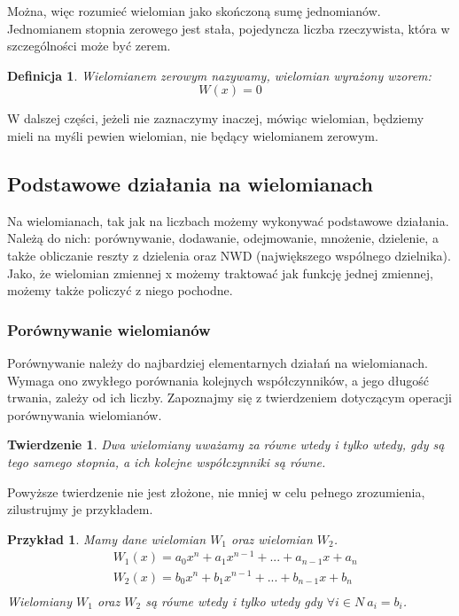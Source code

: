 \documentclass[twoside,a4paper]{book}
\newtheorem{theorem}{Twierdzenie}
\newtheorem{definition}{Definicja}
\newtheorem{example}{Przykład}
\begin{document}
Można, więc rozumieć wielomian jako skończoną sumę jednomianów.
Jednomianem stopnia zerowego jest stała, pojedyncza liczba rzeczywista, która w szczególności może być zerem.

\begin{definition}
	Wielomianem zerowym nazywamy, wielomian wyrażony wzorem:
	\begin{equation}
		W(x) = 0
	\end{equation}
\end{definition}

W dalszej części, jeżeli nie zaznaczymy inaczej, mówiąc wielomian, będziemy mieli na myśli pewien wielomian, nie będący wielomianem zerowym.

\subsection{Podstawowe działania na wielomianach}

Na wielomianach, tak jak na liczbach możemy wykonywać podstawowe działania. Należą do nich: porównywanie, dodawanie, odejmowanie, mnożenie, dzielenie, a także obliczanie reszty z dzielenia oraz NWD (największego wspólnego dzielnika). Jako, że wielomian zmiennej x możemy traktować jak funkcję jednej zmiennej, możemy także policzyć z niego pochodne.

\subsubsection{Porównywanie wielomianów}

Porównywanie należy do najbardziej elementarnych działań na wielomianach. Wymaga ono zwykłego porównania kolejnych współczynników, a jego długość trwania, zależy od ich liczby. Zapoznajmy się z twierdzeniem dotyczącym operacji porównywania wielomianów.

\begin{theorem}
	Dwa wielomiany uważamy za równe wtedy i tylko wtedy, gdy są tego samego stopnia, a ich kolejne współczynniki są równe.
\end{theorem}

Powyższe twierdzenie nie jest złożone, nie mniej w celu pełnego zrozumienia, zilustrujmy je przykładem. 

\begin{example}
	Mamy dane wielomian $W_1$ oraz wielomian $W_2$.
	\begin{equation}
		\begin{split}
			&W_1(x) = a_0x^n + a_1x^{n-1} + ... + a_{n-1}x + a_n \\
			&W_2(x) = b_0x^n + b_1x^{n-1} + ... + b_{n-1}x + b_n \\
		\end{split}
	\end{equation}
	Wielomiany $W_1$ oraz $W_2 $ są równe wtedy i tylko wtedy gdy
	$\forall{i\in N}\ a_i = b_i$.
\end{example}
\end{document}
